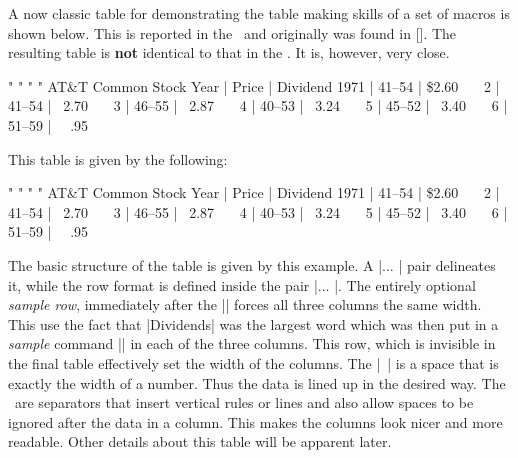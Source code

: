 A now classic table for demonstrating the table making skills of a set of
macros is shown below. This is reported in the \texbook\ and originally was
found in [\cite{[Lesk76]}]. The resulting table is {\bf not}
identical to that in the \texbook. It is, however, very close.

\centerline{
\begintable
\begintableformat
\center " \center " \center
\endtableformat
\br{}  " "  \er{} %
\-
\br{\:|}     AT\&T Common Stock         \er{|}
\-
\br{\:|}     Year |   Price |  Dividend       \er{|}
\-
\br{\:|}     1971 | 41--54  |    \$2.60        \er{|}
\-
\br{\:|}     ~~~2 | 41--54  |     ~2.70        \er{|}
\-
\br{\:|}     ~~~3 | 46--55  |     ~2.87        \er{|}
\-
\br{\:|}     ~~~4 | 40--53  |     ~3.24        \er{|}
\-
\br{\:|}     ~~~5 | 45--52  |     ~3.40        \er{|}
\-
\br{\:|}     ~~~6 | 51--59  |     ~~.95\rlap*  \er{|}
\-
\br{\:}  
\endtable 
}

This table is given by the following:
\begingroup \eightpoint
\begintt
\centerline{
\begintable
\begintableformat
\center " \center " \center
\endtableformat
\br{}  " "  \er{} %
\-
\br{\:|}     AT\&T Common Stock         \er{|}
\-
\br{\:|}     Year |   Price |  Dividend       \er{|}
\-
\br{\:|}     1971 | 41--54  |    \$2.60        \er{|}
\-
\br{\:|}     ~~~2 | 41--54  |     ~2.70        \er{|}
\-
\br{\:|}     ~~~3 | 46--55  |     ~2.87        \er{|}
\-
\br{\:|}     ~~~4 | 40--53  |     ~3.24        \er{|}
\-
\br{\:|}     ~~~5 | 45--52  |     ~3.40        \er{|}
\-
\br{\:|}     ~~~6 | 51--59  |     ~~.95\rlap*  \er{|}
\-
\br{\:}  
\endtable 
}
\endtt
\endgroup
The basic structure of the table is given by this example. A
|\begintable... \endtable| pair  delineates it, while the row format is
defined inside the pair |\begintableformat... \endtableformat|. 
The entirely optional {\it sample row}, immediately after the 
|\endtableformat| forces all
three columns the same width. This use the fact that
|Dividends| was the largest word which  was then put in a {\it
sample} command || in each of the three columns. This row, which is
invisible in the final table effectively set the width of the columns. The
|~| is a space that is exactly the width of a number. Thus the data is lined
up in the desired way. The \vrt\ are separators that insert vertical rules or
lines and also allow spaces to be ignored after the data in a column. This
makes the columns look nicer and more readable. Other details about this
table will be apparent later.


